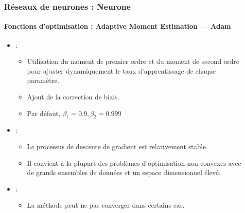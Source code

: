 \documentclass[xcolor=table]{beamer}
\begin{document}
\begin{frame}
\frametitle{Réseaux de neurones : Neurone}
\framesubtitle{Fonctions d'optimisation : Adaptive Moment Estimation — Adam}

\begin{itemize}
	\item {} : 
	\begin{itemize}
		\item Utilisation du moment de premier ordre et du moment de second ordre pour ajuster dynamiquement le taux d'apprentissage de chaque paramètre. 
		\item Ajout de la correction de biais.
		\item Par défaut, $\beta_1 = 0.9, \beta_2 = 0.999$ 
	\end{itemize}
	\item {} : 
	\begin{itemize}
		\item Le processus de descente de gradient est relativement stable. 
		\item Il convient à la plupart des problèmes d'optimisation non convexes avec de grands ensembles de données et un espace dimensionnel élevé.
	\end{itemize}
	\item {} : 
	\begin{itemize}
		\item La méthode peut ne pas converger dans certains cas.
	\end{itemize}
\end{itemize}

\end{frame}
\end{document}
